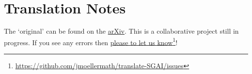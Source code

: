 \chapter*{Translation Notes}

The `original' can be found on the \href{https://arxiv.org/abs/math/0206203}{arXiv}.
This is a collaborative project still in progress. If you see any errors then \href{https://github.com/jmoellermath/translate-SGAI/issues}{please to let us know}\footnote{\url{https://github.com/jmoellermath/translate-SGAI/issues}}!

